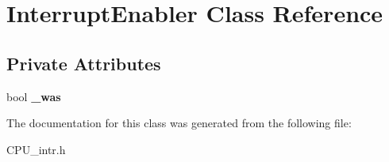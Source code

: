 \hypertarget{class_interrupt_enabler}{}\section{Interrupt\+Enabler Class Reference}
\label{class_interrupt_enabler}
\subsection*{Private Attributes}
\begin{DoxyCompactItemize}
\item 
\mbox{\label{class_interrupt_enabler_a2a43d382f98caf7844c520a66fafe7f5}} 
bool {\bfseries \+\_\+was}
\end{DoxyCompactItemize}


The documentation for this class was generated from the following file\+:\begin{DoxyCompactItemize}
\item 
C\+P\+U\+\_\+intr.\+h\end{DoxyCompactItemize}
